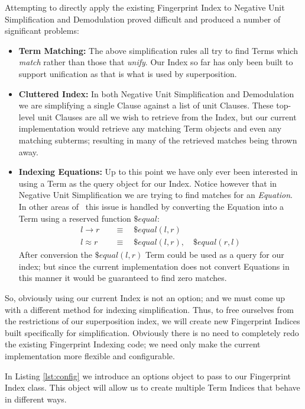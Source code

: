 Attempting to directly apply the existing Fingerprint Index to Negative Unit Simplification and
Demodulation proved difficult and produced a number of significant problems:
\begin{itemize}
\item \textbf{Term Matching:} The above simplification rules all try to find Terms which
\emph{match} rather than those that \emph{unify}. Our Index so far has only
been built to support unification as that is what is used by superposition.
\item \textbf{Cluttered Index:} In both Negative Unit Simplification and Demodulation we are simplifying
a single Clause against a list of unit Clauses. These top-level unit Clauses are
all we wish to retrieve from the Index, but our current implementation would retrieve
any matching Term objects and even any matching subterms; resulting in many
of the retrieved matches being thrown away.
\item \textbf{Indexing Equations:} Up to this point we have only ever been interested
in using a Term as the query object for our Index. Notice however that in Negative
Unit Simplification we are trying to find matches for an \emph{Equation}. In other areas of \beagle\ 
this issue is handled by converting the Equation into a Term using a reserved
function $\$equal$:
\begin{align*}
l \to r &\quad\equiv\quad \$equal (l, r) \\
l \approx r &\quad\equiv\quad \$equal (l, r), \quad  \$equal (r, l)
\end{align*}
After conversion the $\$equal (l, r)$ Term could be used as a query for our index;
but since the current implementation does not convert Equations in this manner
it would be guaranteed to find zero matches.
\end{itemize}

So, obviously using our current Index is not an option; and we must come up with
a different method for indexing simplification. Thus, to free ourselves from
the restrictions of our superposition index, we will create new Fingerprint
Indices built specifically for simplification. Obviously there is no need
to completely redo the existing Fingerprint Indexing code; we need only
make the current implementation more flexible and configurable.

In Listing \ref{lst:config} we introduce an options object to pass to our Fingerprint Index class.
This object will allow us to create multiple Term Indices that behave in different
ways.

